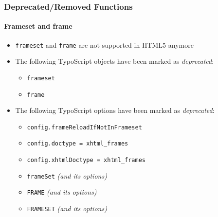 \begin{frame}[fragile]
	\frametitle{Deprecated/Removed Functions}
	\framesubtitle{Frameset and frame}

	\begin{itemize}
		\item \texttt{frameset} and \texttt{frame} are not supported in HTML5 anymore
		\item The following TypoScript objects have been marked as \textit{deprecated}:

			\begin{itemize}
				\item \texttt{frameset}
				\item \texttt{frame}
			\end{itemize}

		\item The following TypoScript options have been marked as \textit{deprecated}:

			\begin{itemize}
				\item \texttt{config.frameReloadIfNotInFrameset}
				\item \texttt{config.doctype = xhtml\_frames}
				\item \texttt{config.xhtmlDoctype = xhtml\_frames}
				\item \texttt{frameSet} \tabto{1.8cm}\textit{(and its options)}
				\item \texttt{FRAME} \tabto{1.8cm}\textit{(and its options)}
				\item \texttt{FRAMESET} \tabto{1.8cm}\textit{(and its options)}
			\end{itemize}

	\end{itemize}

\end{frame}






